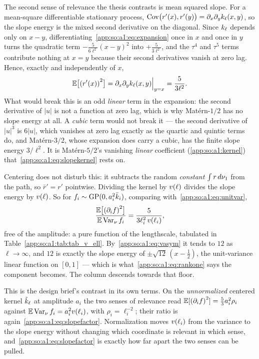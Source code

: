 \label{app:so:a1:slope}

The second sense of relevance the thesis contrasts is mean squared slope. For
a mean-square differentiable stationary process,
$\operatorname{Cov}\bigl(r'(x),r'(y)\bigr)=\partial_x\partial_yk_\ell(x,y)$, so
the slope energy is the mixed second derivative on the diagonal. Since $k_\ell$
depends only on $x-y$, differentiating~\eqref{app:so:a1:eq:expansion} once in
$x$ and once in $y$ turns the quadratic term $-\tfrac{5}{6\ell^2}{(x-y)}^2$
into $+\tfrac{5}{3\ell^2}$, and the $\tau^4$ and $\tau^5$ terms contribute
nothing at $x=y$ because their second derivatives vanish at zero lag. Hence,
exactly and independently of $x$,
\begin{equation}\label{app:so:a1:eq:slopekernel}
  \Ex{}\bigl[{(r'(x))}^2\bigr]
  =\partial_x\partial_y\kl(x,y)\Big|_{y=x}
  =\frac{5}{3\ell^2}.
\end{equation}
What would break this is an odd \emph{linear} term in the expansion: the
second derivative of $|u|$ is not a function at zero lag, which is why
Mat\'ern-$1/2$ has no slope energy at all. A \emph{cubic} term would not break
it --- the second derivative of ${|u|}^3$ is $6|u|$, which vanishes at zero
lag exactly as the quartic and quintic terms do, and Mat\'ern-$3/2$, whose
expansion does carry a cubic, has the finite slope energy $3/\ell^2$. It is
Mat\'ern-$5/2$'s vanishing \emph{linear} coefficient (\ref{app:so:a1:kernel})
that~\eqref{app:so:a1:eq:slopekernel} rests on.

Centering does not disturb this: it subtracts the random \emph{constant} $\int
r\,d\nu_1$ from the path, so $\bar r'=r'$ pointwise. Dividing the kernel by
$v(\ell)$ divides the slope energy by $v(\ell)$. So for
$f_i\sim\mathrm{GP}(0,a_i^2\bar k_i)$, comparing
with~\eqref{app:so:a1:eq:unitvar},
\begin{equation}\label{app:so:a1:eq:slopefactor}
  \frac{\Ex{}\bigl[{(\partial_i f)}^2\bigr]}{\Ex{}\Varnu f_i}
  =\frac{5}{3\ell_i^2\,\vell{\ell_i}},
\end{equation}
free of the amplitude: a pure function of the lengthscale, tabulated in
Table~\ref{app:so:a1:tab:tab_v_ell}. By~\eqref{app:so:a1:eq:vasym} it tends to
$12$ as $\ell\to\infty$, and $12$ is exactly the slope energy of
$\pm\sqrt{12}\,(x-\tfrac12)$, the unit-variance linear function on $[0,1]$ ---
which is what~\eqref{app:so:a1:eq:rankone} says the component becomes. The
column descends towards that floor.

This is the design brief's contrast in its own terms. On the
\emph{unnormalized} centered kernel $\tilde k_\ell$ at amplitude $a_i$ the two senses
of relevance read $\Ex{}[{(\partial_i f)}^2]=\tfrac53a_i^2\rho_i$ against
$\Ex{}\Varnu f_i=a_i^2\vell{\ell_i}$, with $\rho_i=\ell_i^{-2}$; their ratio
is again~\eqref{app:so:a1:eq:slopefactor}. Normalization moves $v(\ell_i)$
from the variance to the slope energy without changing which coordinate is
relevant in which sense, and~\eqref{app:so:a1:eq:slopefactor} is exactly how
far apart the two senses can be pulled.

